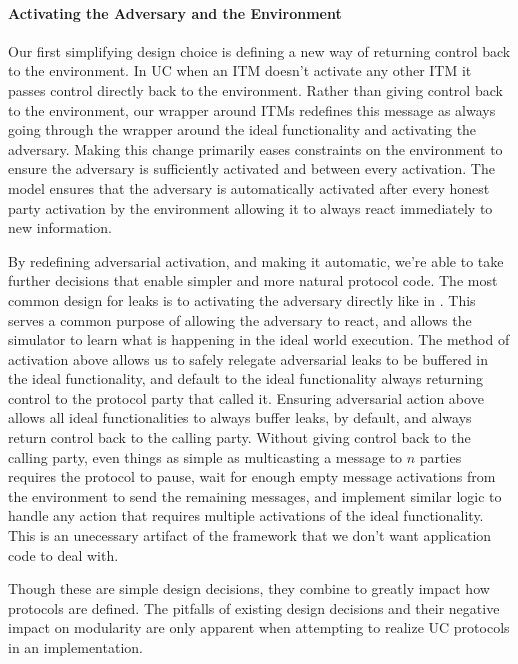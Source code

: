 \paragraph{Activating the Adversary and the Environment}
Our first simplifying design choice is defining a new way of returning control back to the environment.
In UC when an ITM doesn't activate any other ITM it passes control directly back to the environment.
Rather than giving control back to the environment, our wrapper around ITMs redefines this message as always going through the wrapper around the ideal functionality and activating the adversary.
Making this change primarily eases constraints on the environment to ensure the adversary is sufficiently activated and between every activation. 
The model ensures that the adversary is automatically activated after every honest party activation by the environment allowing it to always react immediately to new information. 

By redefining adversarial activation, and making it automatic, we're able to take further decisions that enable simpler and more natural protocol code.
The most common design for leaks is to activating the adversary directly like in \Fchan. 
This serves a common purpose of allowing the adversary to react, and allows the simulator to learn what is happening in the ideal world execution.
The method of activation above allows us to safely relegate adversarial leaks to be buffered in the ideal functionality, and default to the ideal functionality always returning control to the protocol party that called it.
Ensuring adversarial action above allows all ideal functionalities to always buffer leaks, by default, and always return control back to the calling party.
Without giving control back to the calling party, even things as simple as multicasting a message to $n$ parties requires the protocol to pause, wait for enough empty message activations from the environment to send the remaining messages, and implement similar logic to handle any action that requires multiple activations of the ideal functionality.
This is an unecessary artifact of the framework that we don't want application code to deal with. 

Though these are simple design decisions, they combine to greatly impact how protocols are defined. The pitfalls of existing design decisions and their negative impact on modularity are only apparent when attempting to realize UC protocols in an implementation.

